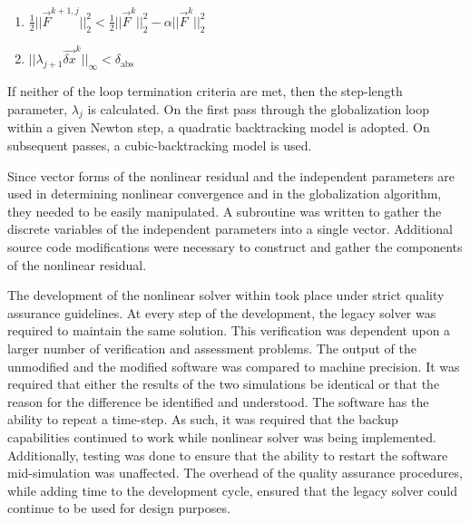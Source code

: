 \begin{enumerate}
\item{$\frac{1}{2}||\vec{F}^{k+1, j}||^{2}_{2} < \frac{1}{2}||\vec{F}^{k}||^{2}_{2} - \alpha ||\vec{F}^{k}||^{2}_{2}$ }
\item{$||\lambda_{j+1} \vec{\delta x}^{k}||_{\infty} < \delta_{\text{abs}}$}
\end{enumerate}

If neither of the loop termination criteria are met, then the step-length parameter, $\lambda_j$ is calculated.
On the first pass through the globalization loop within a given Newton step, a quadratic backtracking model is adopted.
On subsequent passes, a cubic-backtracking model is used.
 
Since vector forms of the nonlinear residual and the independent parameters are used in determining nonlinear convergence and in the globalization algorithm, they needed to be easily manipulated.
A subroutine was written to gather the discrete variables of the independent parameters into a single vector.
Additional source code modifications were necessary to construct and gather the components of the nonlinear residual.

The development of the nonlinear solver within \cobra{} took place under strict quality assurance guidelines.
At every step of the development, the legacy solver was required to maintain the same solution.
This verification was dependent upon a larger number of verification and assessment problems.
The output of the unmodified \cobra{} and the modified \cobra{} software was compared to machine precision.
It was required that either the results of the two simulations be identical or that the reason for the difference be identified and understood.
The \cobra{} software has the ability to repeat a time-step.
As such, it was required that the backup capabilities continued to work while nonlinear solver was being implemented.
Additionally, testing was done to ensure that the ability to restart the software mid-simulation was unaffected.
The overhead of the quality assurance procedures, while adding time to the development cycle, ensured that the legacy solver could continue to be used for design purposes.


